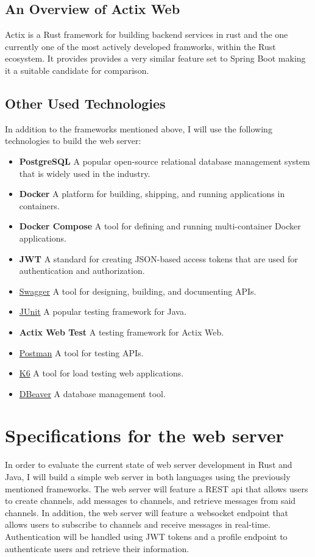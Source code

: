 \documentclass[a4paper,12pt]{article}
\begin{document}
	\subsection{An Overview of Actix Web}
	\label{subsec:actix_web}
	Actix is a Rust framework for building backend services in rust and the one currently one of the most actively developed framworks,
	within the Rust ecosystem. It provides provides a very similar feature set to Spring Boot making it a suitable candidate for comparison.

	\newpage
	\subsection{Other Used Technologies}
	\label{subsec:used_technologies}
	In addition to the frameworks mentioned above, I will use the following technologies to build the web server:
	\begin{itemize}
		\item \textbf{PostgreSQL} \- A popular open-source relational database management system that is widely used in the industry.
		\item \textbf{Docker} \- A platform for building, shipping, and running applications in containers.
		\item \textbf{Docker Compose} \- A tool for defining and running multi-container Docker applications.
		\item \textbf{JWT} \- A standard for creating JSON-based access tokens that are used for authentication and authorization.
		\item \href{https://swagger.io/}{Swagger} \- A tool for designing, building, and documenting APIs.
		\item \href{https://junit.org/junit5/}{JUnit} \- A popular testing framework for Java.
		\item \textbf{Actix Web Test} \- A testing framework for Actix Web.
		\item \href{https://www.postman.com/}{Postman} \- A tool for testing APIs.
		\item \href{https://k6.io/}{K6} \- A tool for load testing web applications.
		\item \href{https://dbeaver.io/}{DBeaver} \- A database management tool.
	\end{itemize}

	\newpage
	\section{Specifications for the web server}
	\label{sec:example_project}
	In order to evaluate the current state of web server development in Rust and Java, I will build a simple web server in 
	both languages using the previously mentioned frameworks. The web server will feature a REST api that allows users to 
	create channels, add messages to channels, and retrieve messages from said channels. In addition, the web server will 
	feature a websocket endpoint that allows users to subscribe to channels and receive messages in real-time. Authentication 
	will be handled using JWT tokens and a profile endpoint to authenticate users and retrieve their information.
\end{document}
